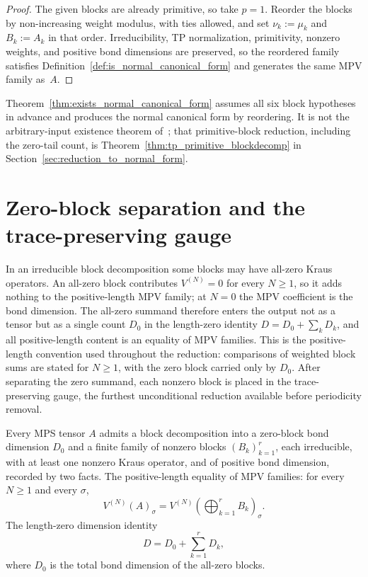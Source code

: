 \begin{proof}\leanok
    The given blocks are already primitive, so take $p = 1$. Reorder the blocks by
    non-increasing weight modulus, with ties allowed, and set $\nu_k := \mu_k$ and
    $B_k := A_k$ in that order. Irreducibility, TP normalization, primitivity,
    nonzero weights, and positive bond dimensions are preserved, so the reordered
    family satisfies Definition~\ref{def:is_normal_canonical_form} and generates
    the same MPV family as~$A$.
\end{proof}

\begin{remark}
    Theorem~\ref{thm:exists_normal_canonical_form} assumes all six block
    hypotheses in advance and produces the normal canonical form by reordering.
    It is not the arbitrary-input existence theorem
    of~\cite[Section~2.3]{Cirac2016MPDO_arXiv}; that primitive-block reduction,
    including the zero-tail count, is
    Theorem~\ref{thm:tp_primitive_blockdecomp} in
    Section~\ref{sec:reduction_to_normal_form}.
\end{remark}

\section{Zero-block separation and the trace-preserving gauge}%
\label{sec:zero_block_separation}

In an irreducible block decomposition some blocks may have all-zero Kraus
operators. An all-zero block contributes $V^{(N)}=0$ for every $N\ge 1$, so it
adds nothing to the positive-length MPV family; at $N=0$ the MPV coefficient is
the bond dimension. The all-zero summand therefore enters the output not as a
tensor but as a single count $D_0$ in the length-zero identity
$D = D_0 + \sum_k D_k$, and all positive-length content is an equality of MPV
families. This is the positive-length convention used throughout the reduction:
comparisons of weighted block sums are stated for $N\ge 1$, with the zero block
carried only by $D_0$. After separating the zero summand, each nonzero block is
placed in the trace-preserving gauge, the furthest unconditional reduction
available before periodicity removal.

\begin{theorem}%
    \label{thm:zero_block_separation}
    \leanok
    Every MPS tensor $A$ admits a block decomposition into a zero-block bond
    dimension $D_0$ and a finite family of nonzero blocks $(B_k)_{k=1}^r$, each
    irreducible, with at least one nonzero Kraus operator, and of positive bond
    dimension, recorded by two facts. The positive-length equality of MPV
    families: for every $N \ge 1$ and every $\sigma$,
    \[
        V^{(N)}(A)_\sigma
        = V^{(N)}\!(\textstyle\bigoplus_{k=1}^r B_k)_\sigma.
    \]
    The length-zero dimension identity
    \[
        D = D_0 + \sum_{k=1}^r D_k,
    \]
    where $D_0$ is the total bond dimension of the all-zero blocks.
\end{theorem}

